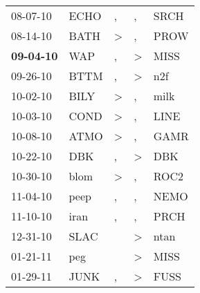 \begin{supertabular}{p{0.07\textwidth}p{0.06\textwidth}p{0.02\textwidth}p{0.02\textwidth}p{0.06\textwidth}}
          08-07-10\textsuperscript{} &           ECHO\textsuperscript{} &                , &                , &           SRCH\textsuperscript{} \\
          08-14-10\textsuperscript{} &           BATH\textsuperscript{} &     \textgreater &                , &           PROW\textsuperscript{} \\
 \textbf{09-04-10\textsuperscript{}} &            WAP\textsuperscript{} &                , &     \textgreater &           MISS\textsuperscript{} \\
          09-26-10\textsuperscript{} &           BTTM\textsuperscript{} &                , &     \textgreater &            n2f\textsuperscript{} \\
          10-02-10\textsuperscript{} &           BILY\textsuperscript{} &     \textgreater &                , &           milk\textsuperscript{} \\
          10-03-10\textsuperscript{} &           COND\textsuperscript{} &     \textgreater &                , &           LINE\textsuperscript{} \\
          10-08-10\textsuperscript{} &           ATMO\textsuperscript{} &     \textgreater &                , &           GAMR\textsuperscript{} \\
          10-22-10\textsuperscript{} &            DBK\textsuperscript{} &                , &     \textgreater &            DBK\textsuperscript{} \\
          10-30-10\textsuperscript{} &           blom\textsuperscript{} &     \textgreater &                , &           ROC2\textsuperscript{} \\
          11-04-10\textsuperscript{} &           peep\textsuperscript{} &                , &                , &           NEMO\textsuperscript{} \\
          11-10-10\textsuperscript{} &           iran\textsuperscript{} &                , &                , &           PRCH\textsuperscript{} \\
          12-31-10\textsuperscript{} &           SLAC\textsuperscript{} &                  &     \textgreater &           ntan\textsuperscript{} \\
          01-21-11\textsuperscript{} &            peg\textsuperscript{} &                  &     \textgreater &           MISS\textsuperscript{} \\
          01-29-11\textsuperscript{} &           JUNK\textsuperscript{} &                , &     \textgreater &           FUSS\textsuperscript{} \\

\end{supertabular}
